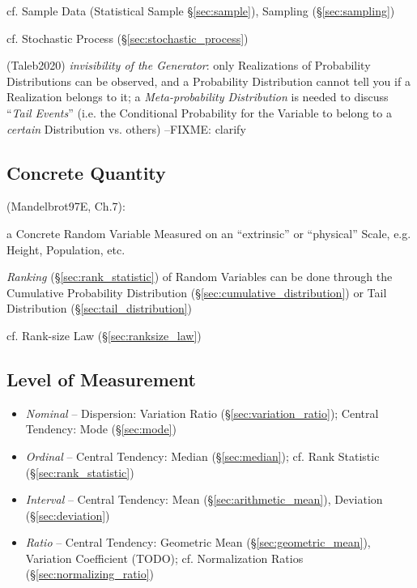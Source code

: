 \fist cf. Sample Data (Statistical Sample \S\ref{sec:sample}), Sampling
(\S\ref{sec:sampling})

\fist cf. Stochastic Process (\S\ref{sec:stochastic_process})

(Taleb2020) \emph{invisibility of the Generator}: only Realizations of
Probability Distributions can be observed, and a Probability Distribution cannot
tell you if a Realization belongs to it; a \emph{Meta-probability Distribution}
is needed to discuss ``\emph{Tail Events}'' (i.e. the Conditional Probability
for the Variable to belong to a \emph{certain} Distribution vs. others) --FIXME:
clarify



\subsection{Concrete Quantity}\label{sec:concrete_quantity}

(Mandelbrot97E, Ch.7):

a Concrete Random Variable Measured on an ``extrinsic'' or ``physical'' Scale,
e.g. Height, Population, etc.

\emph{Ranking} (\S\ref{sec:rank_statistic}) of Random Variables can be done
through the Cumulative Probability Distribution
(\S\ref{sec:cumulative_distribution}) or Tail Distribution
(\S\ref{sec:tail_distribution})

cf. Rank-size Law (\S\ref{sec:ranksize_law})



\subsection{Level of Measurement}\label{sec:measurement_level}

\begin{itemize}
  \item \emph{Nominal} -- Dispersion: Variation Ratio
    (\S\ref{sec:variation_ratio}); Central Tendency: Mode (\S\ref{sec:mode})
  \item \emph{Ordinal} -- Central Tendency: Median (\S\ref{sec:median});
    cf. Rank Statistic (\S\ref{sec:rank_statistic})
  \item \emph{Interval} -- Central Tendency: Mean (\S\ref{sec:arithmetic_mean}),
    Deviation (\S\ref{sec:deviation})
  \item \emph{Ratio} -- Central Tendency: Geometric Mean
    (\S\ref{sec:geometric_mean}), Variation Coefficient (TODO);
    cf. Normalization Ratios (\S\ref{sec:normalizing_ratio})
\end{itemize}




